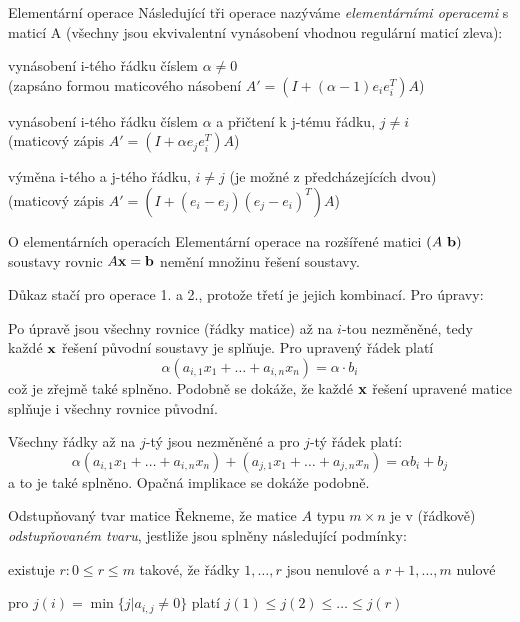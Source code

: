 \begin{definiceN}{Elementární operace}
Následující tři operace nazýváme \emph{elementárními operacemi} s maticí A (všechny jsou ekvivalentní vynásobení vhodnou regulární maticí zleva):
\begin{penumerate}
    \item vynásobení i-tého řádku číslem $\alpha \neq 0$ \\ 
	(zapsáno formou maticového násobení $A' = (I+(\alpha -1)e_i e_i^T)A$)
    \item vynásobení i-tého řádku číslem $\alpha$ a přičtení k j-tému řádku, $j \neq i$  \\
	(maticový zápis $A' = (I+\alpha e_j e_i^T)A$)
    \item výměna i-tého a j-tého řádku, $i \neq j$ (je možné  z předcházejících dvou) \\
	(maticový zápis $A' = (I+(e_i - e_j)(e_j-e_i)^T) A$)
\end{penumerate}
\end{definiceN}

\begin{vetaN}{O elementárních operacích}
Elementární operace na rozšířené matici $(A\ \mathbf{b})$ soustavy rovnic $A\mathbf{x}=\mathbf{b}$ nemění množinu řešení soustavy.
\par\medskip
\begin{dukaz}
Důkaz stačí pro operace 1. a 2., protože třetí je jejich kombinací. Pro úpravy:
\begin{penumerate}
    \item Po úpravě jsou všechny rovnice (řádky matice) až na $i$-tou nezměněné, tedy každé $\mathbf{x}$ řešení původní soustavy je splňuje. Pro upravený řádek platí $$\alpha(a_{i,1}x_1+\dots+a_{i,n}x_n)=\alpha\cdot b_i$$ což je zřejmě také splněno. Podobně se dokáže, že každé $\mathbf{x}$ řešení upravené matice splňuje i všechny rovnice původní.
    \item Všechny řádky až na $j$-tý jsou nezměněné a pro $j$-tý řádek platí: 
$$\alpha(a_{i,1}x_1+\dots+a_{i,n}x_n)+(a_{j,1}x_1+\dots+a_{j,n}x_n)=\alpha b_i + b_j$$
a to je také splněno. Opačná implikace se dokáže podobně.
\end{penumerate}
\end{dukaz}
\end{vetaN}

\begin{definiceN}{Odstupňovaný tvar matice}
Řekneme, že matice $A$ typu $m\times n$ je v (řádkově) \emph{odstupňovaném tvaru}, jestliže jsou splněny následující podmínky:
\begin{penumerate}
    \item existuje $r: 0\leq r \leq m$ takové, že řádky $1,\dots,r$ jsou nenulové a $r+1,\dots,m$ nulové
    \item pro $j(i)=\min\{j | a_{i,j}\neq 0\}$ platí $j(1)\leq j(2)\leq \dots\leq j(r)$
\end{penumerate}
\end{definiceN}

